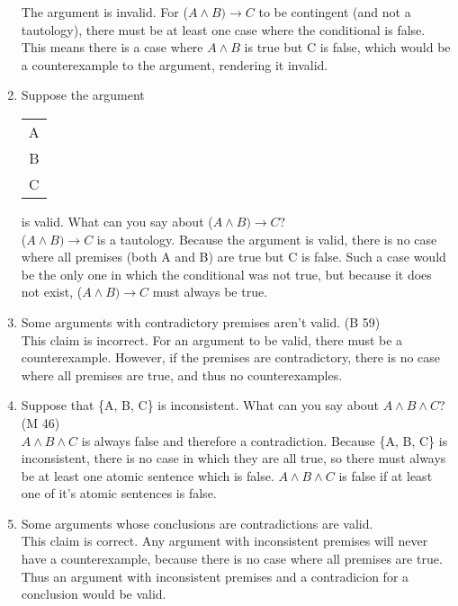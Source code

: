 \documentclass{article}
\begin{document}
\begin{enumerate}
            The argument is invalid. For ($A \land B) \to C$ to be contingent (and not a tautology), there must be at least one case where the conditional is false. This means there is a case where $A \land B$ is true but C is false, which would be a counterexample to the argument, rendering it invalid.
      \item Suppose the argument \begin{tabular}{c}A\\B\\\hline C\end{tabular} is valid. What can you say about ($A \land B) \to C$?\\
            ($A \land B) \to C$ is a tautology. Because the argument is valid, there is no case where all premises (both A and B) are true but C is false. Such a case would be the only one in which the conditional was not true, but because it does not exist, ($A \land B) \to C$ must always be true.
      \item Some arguments with contradictory premises aren't valid. (B 59)\\
            This claim is incorrect. For an argument to be valid, there must be a counterexample. However, if the premises are contradictory, there is no case where all premises are true, and thus no counterexamples.
      \item Suppose that \{A, B, C\} is inconsistent. What can you say about $A \land B \land C$? (M 46)\\
            $A \land B \land C$ is always false and therefore a contradiction. Because \{A, B, C\} is inconsistent, there is no case in which they are all true, so there must always be at least one atomic sentence which is false. $A \land B \land C$ is false if at least one of it's atomic sentences is false.
      \item Some arguments whose conclusions are contradictions are valid.\\
            This claim is correct. Any argument with inconsistent premises will never have a counterexample, because there is no case where all premises are true. Thus an argument with inconsistent premises and a contradicion for a conclusion would be valid.

\end{enumerate}
\end{document}
